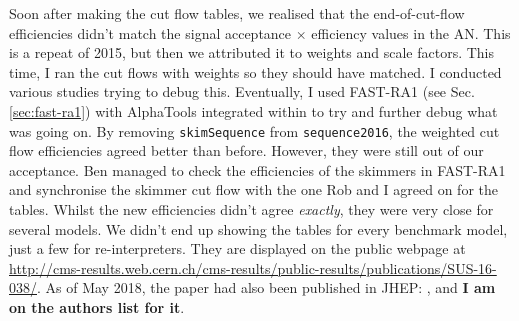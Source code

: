 Soon after making the cut flow tables, we realised that the end-of-cut-flow efficiencies didn't match the signal acceptance $\times$ efficiency values in the AN. This is a repeat of 2015, but then we attributed it to weights and scale factors. This time, I ran the cut flows with weights so they should have matched. I conducted various studies trying to debug this. Eventually, I used FAST-RA1 (see Sec. \ref{sec:fast-ra1}) with AlphaTools integrated within to try and further debug what was going on. By removing \texttt{skimSequence} from \texttt{sequence2016}, the weighted cut flow efficiencies agreed better than before. However, they were still out of our acceptance. Ben managed to check the efficiencies of the skimmers in FAST-RA1 and synchronise the skimmer cut flow with the one Rob and I agreed on for the tables. Whilst the new efficiencies didn't agree \emph{exactly}, they were very close for several models. We didn't end up showing the tables for every benchmark model, just a few for re-interpreters. They are displayed on the public webpage at \url{http://cms-results.web.cern.ch/cms-results/public-results/publications/SUS-16-038/}. As of May 2018, the paper had also been published in JHEP: \cite{SUS16038published}, and \textbf{I am on the authors list for it}.

